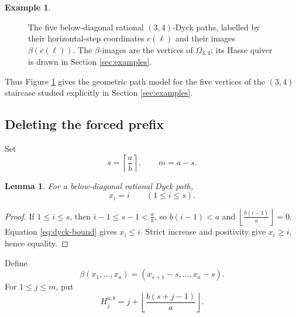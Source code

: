 \documentclass[12pt,a4paper,english,reqno]{amsart}
\theoremstyle{plain}
\newtheorem{lemma}[theorem]{Lemma}
\theoremstyle{definition}
\newtheorem{exm}[theorem]{Example}
\begin{document}
\begin{exm}
\begin{figure}[htbp]
\caption{The five below-diagonal rational $(3,4)$-Dyck paths, labelled by
their horizontal-step coordinates $c(\ell)$ and their images
$\beta(c(\ell))$.  The $\beta$-images are the vertices of
$\Omega_{3,4}$; its Hasse quiver is drawn in Section \ref{sec:examples}.}
\label{fig:34-below-paths}
\end{figure}

Thus Figure \ref{fig:34-below-paths} gives the geometric path model for the
five vertices of the $(3,4)$ staircase studied explicitly in
Section \ref{sec:examples}. 
\end{exm}



\subsection{Deleting the forced prefix}

Set
\begin{equation}
 s=\left\lceil\frac ab\right\rceil,\qquad m=a-s.
\label{eq:s-m}
\end{equation}

\begin{lemma}
\label{lem:forced-prefix}
For a below-diagonal rational Dyck path,
\[
 x_i=i\qquad(1\leq i\leq s).
\]
\end{lemma}

\begin{proof}
If $1\leq i\leq s$, then $i-1\leq s-1<\frac ab$,
so $b(i-1)<a$ and $\left\lfloor\frac{b(i-1)}a\right\rfloor=0$.
Equation \eqref{eq:dyck-bound} gives $x_i\leq i$.  Strict increase and
positivity give $x_i\geq i$, hence equality.
\end{proof}

Define
\begin{equation}
 \beta(x_1,\ldots,x_a)
 =(x_{s+1}-s,\ldots,x_a-s).
\label{eq:beta}
\end{equation}
For $1\leq j\leq m$, put
\begin{equation}
 H_j^{a,b}
 =
 j+\left\lfloor\frac{b(s+j-1)}a\right\rfloor.
\label{eq:Dyck-H}
\end{equation}
\end{document}
